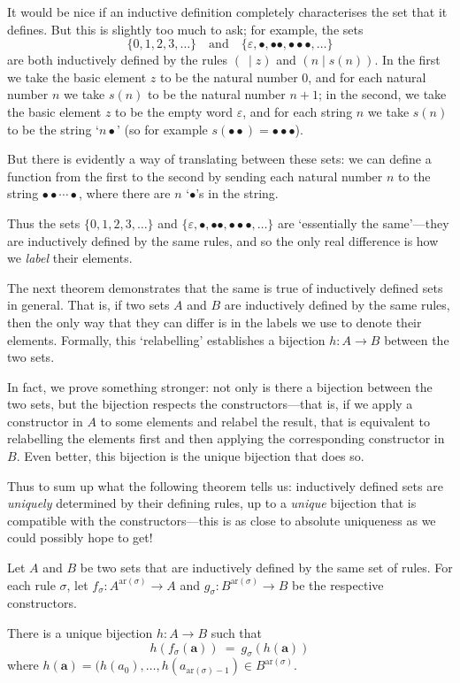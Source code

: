 It would be nice if an inductive definition completely characterises the set that it defines. But this is slightly too much to ask; for example, the sets
\[ \{ 0, 1, 2, 3, \dots \} \quad \text{and} \quad \{ \varepsilon, {\bullet}, {\bullet} {\bullet}, {\bullet} {\bullet} {\bullet}, \dots \} \]
are both inductively defined by the rules $(~ \mid z)$ and $(n \mid s(n))$. In the first we take the basic element $z$ to be the natural number $0$, and for each natural number $n$ we take $s(n)$ to be the natural number $n+1$; in the second, we take the basic element $z$ to be the empty word $\varepsilon$, and for each string $n$ we take $s(n)$ to be the string `$n {\bullet}$' (so for example $s({\bullet} {\bullet}) = {\bullet} {\bullet} {\bullet}$).

But there is evidently a way of translating between these sets: we can define a function from the first to the second by sending each natural number $n$ to the string ${\bullet} {\bullet} \cdots {\bullet}$, where there are $n$ `${\bullet}$'s in the string.

Thus the sets $\{ 0, 1, 2, 3, \dots \}$ and $\{ \varepsilon, {\bullet}, {\bullet}{\bullet}, {\bullet}{\bullet}{\bullet}, \dots \}$ are `essentially the same'---they are inductively defined by the same rules, and so the only real difference is how we \textit{label} their elements.

The next theorem demonstrates that the same is true of inductively defined sets in general. That is, if two sets $A$ and $B$ are inductively defined by the same rules, then the only way that they can differ is in the labels we use to denote their elements. Formally, this `relabelling' establishes a bijection $h : A \to B$ between the two sets.

In fact, we prove something stronger: not only is there a bijection between the two sets, but the bijection respects the constructors---that is, if we apply a constructor in $A$ to some elements and relabel the result, that is equivalent to relabelling the elements first and then applying the corresponding constructor in $B$. Even better, this bijection is the unique bijection that does so.

Thus to sum up what the following theorem tells us: inductively defined sets are \textit{uniquely} determined by their defining rules, up to a \textit{unique} bijection that is compatible with the constructors---this is as close to absolute uniqueness as we could possibly hope to get!

\begin{theorem}
\label{thmUniquenessOfInductivelyDefinedSets}
Let $A$ and $B$ be two sets that are inductively defined by the same set of rules. For each rule $\sigma$, let $f_{\sigma} : A^{\mathrm{ar}(\sigma)} \to A$ and $g_{\sigma} : B^{\mathrm{ar}(\sigma)} \to B$ be the respective constructors.

There is a unique bijection $h : A \to B$ such that
\[ h(f_{\sigma}(\mathbf{a})) ~=~ g_{\sigma}(h(\mathbf{a})) \]
where $h(\mathbf{a}) = (h(a_0), \dots, h(a_{\mathrm{ar}(\sigma) - 1}) \in B^{\mathrm{ar}(\sigma)}$.
\end{theorem}

